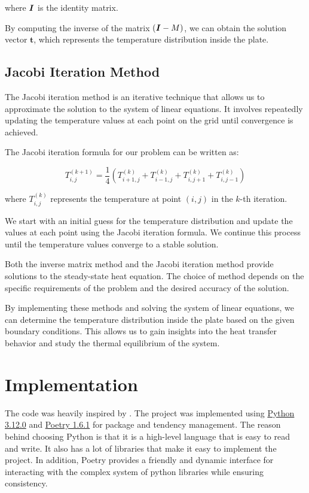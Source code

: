 \documentclass{article}
\begin{document}
\begin{multicols}{2}
where $\textbf{\textit{I}}$ is the identity matrix.

By computing the inverse of the matrix $(\textbf{\textit{I}} - M)$, we can obtain the solution vector $\textbf{t}$, which represents the temperature distribution inside the plate.

\subsection{Jacobi Iteration Method}
The Jacobi iteration method is an iterative technique that allows us to approximate the solution to the system of linear equations. It involves repeatedly updating the temperature values at each point on the grid until convergence is achieved.

The Jacobi iteration formula for our problem can be written as:

\begin{equation}
  T_{i, j}^{(k+1)} = \frac{1}{4} ( T_{i+1,j}^{(k)} + T_{i-1,j}^{(k)} + T_{i,j+1}^{(k)} + T_{i,j-1}^{(k)})
\end{equation}

where $T_{i, j}^{(k)}$ represents the temperature at point $(i,j)$ in the $k$-th iteration.

We start with an initial guess for the temperature distribution and update the values at each point using the Jacobi iteration formula. We continue this process until the temperature values converge to a stable solution.

Both the inverse matrix method and the Jacobi iteration method provide solutions to the steady-state heat equation. The choice of method depends on the specific requirements of the problem and the desired accuracy of the solution.

By implementing these methods and solving the system of linear equations, we can determine the temperature distribution inside the plate based on the given boundary conditions. This allows us to gain insights into the heat transfer behavior and study the thermal equilibrium of the system.

\section{Implementation}
The code was heavily inspired by \cite{gandhi, matlab}. The project was
implemented using \href{https://www.python.org/}{Python 3.12.0} and
\href{https://python-poetry.org/}{Poetry 1.6.1} for package and tendency
management. The reason behind choosing Python is that it is a high-level
language that is easy to read and write. It also has a lot of libraries that
make it easy to implement the project. In addition, Poetry provides a friendly
and dynamic interface for interacting with the complex system of python
libraries while ensuring consistency.


\end{multicols}
\end{document}
